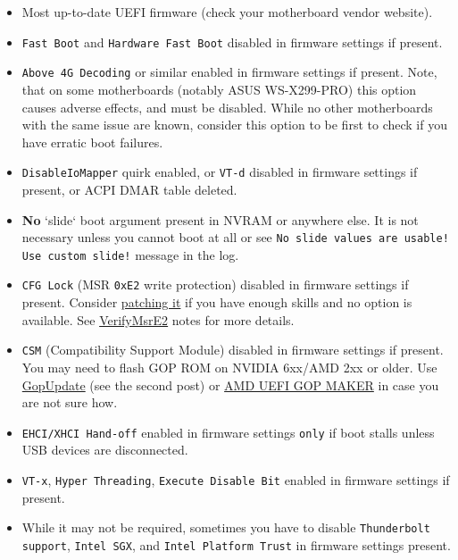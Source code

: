 \documentclass[]{article}
\providecommand{\tightlist}{%
  \setlength{\itemsep}{0pt}\setlength{\parskip}{0pt}}
\begin{document}
\begin{itemize}
\tightlist
\item Most up-to-date UEFI firmware (check your motherboard vendor website).
\item \texttt{Fast Boot} and \texttt{Hardware Fast Boot} disabled in firmware
  settings if present.
\item \texttt{Above 4G Decoding} or similar enabled in firmware
  settings if present. Note, that on some motherboards (notably ASUS WS-X299-PRO) this
  option causes adverse effects, and must be disabled. While no other motherboards
  with the same issue are known, consider this option to be first to check if you
  have erratic boot failures.
\item \texttt{DisableIoMapper} quirk enabled, or \texttt{VT-d} disabled in
  firmware settings if present, or ACPI DMAR table deleted.
\item \textbf{No} `slide` boot argument present in NVRAM or anywhere else.
  It is not necessary unless you cannot boot at all or see
  \texttt{No slide values are usable! Use custom slide!} message in the log.
\item \texttt{CFG Lock} (MSR \texttt{0xE2} write protection) disabled in
  firmware settings if present. Consider
\href{https://github.com/LongSoft/UEFITool/blob/master/UEFIPatch/patches.txt}{patching it}
  if you have enough skills and no option is available. See
\hyperref[kernelpropsquirks]{VerifyMsrE2}
  notes for more details.
\item \texttt{CSM} (Compatibility Support Module) disabled in firmware settings
  if present. You may need to flash GOP ROM on NVIDIA 6xx/AMD 2xx or older. Use
  \href{https://www.win-raid.com/t892f16-AMD-and-Nvidia-GOP-update-No-requests-DIY.html}{GopUpdate}
  (see the second post) or \href{http://www.insanelymac.com/forum/topic/299614-asus-eah6450-video-bios-uefi-gop-upgrade-and-gop-uefi-binary-in-efi-for-many-ati-cards/page-1#entry2042163}{AMD UEFI GOP MAKER}
  in case you are not sure how.
\item \texttt{EHCI/XHCI Hand-off} enabled in firmware settings \texttt{only} if boot
  stalls unless USB devices are disconnected.
\item \texttt{VT-x}, \texttt{Hyper Threading}, \texttt{Execute Disable Bit} enabled
  in firmware settings if present.
\item While it may not be required, sometimes you have to disable
  \texttt{Thunderbolt support}, \texttt{Intel SGX}, and \texttt{Intel Platform Trust}
  in firmware settings present.
\end{itemize}
\end{document}
